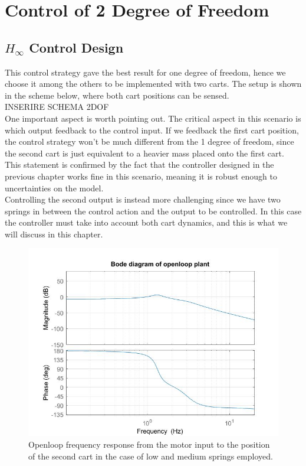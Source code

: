 \chapter{Control of 2 Degree of Freedom}


\section{$H_\infty$ Control Design}
This control strategy gave the best result for one degree of freedom, hence we choose it among the others to be implemented with two carts. The setup is shown in the scheme below, where both cart positions can be sensed.\\

INSERIRE SCHEMA 2DOF\\

One important aspect is worth pointing out. The critical aspect in this scenario is which output feedback to the control input. If we feedback the first cart position, the control strategy won't be much different from the 1 degree of freedom, since the second cart is just equivalent to a heavier mass placed onto the first cart. This statement is confirmed by the fact that the controller designed in the previous chapter works fine in this scenario, meaning it is robust enough to uncertainties on the model.\\

Controlling the second output is instead more challenging since we have two springs in between the control action and the output to be controlled. In this case the controller must take into account both cart dynamics, and this is what we will discuss in this chapter.\\

\begin{figure}[h]
\centering
\includegraphics[width=0.5\linewidth]{img/bode_ol}
\caption{Openloop frequency response from the motor input to the position of the second cart in the case of low and medium springs employed.}
\label{fig:bodeol}
\end{figure}

